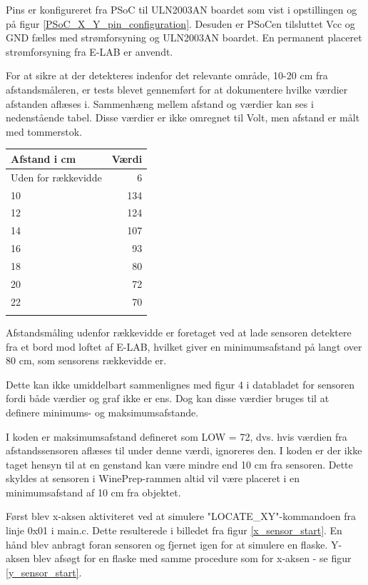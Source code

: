 Pins er konfigureret fra PSoC til ULN2003AN boardet som vist i opstillingen og på figur \ref{PSoC_X_Y_pin_configuration}. Desuden er PSoCen tilsluttet Vcc og GND fælles med strømforsyning og ULN2003AN boardet. En permanent placeret strømforsyning fra E-LAB er anvendt.

For at sikre at der detekteres indenfor det relevante område, 10-20 cm fra afstandsmåleren, er tests blevet gennemført for at dokumentere hvilke værdier afstanden aflæses i. Sammenhæng mellem afstand og værdier kan ses i nedenstående tabel. Disse værdier er ikke omregnet til Volt, men afstand er målt med tommerstok.
\begin{table}[H]
\begin{tabular}{| l | r |}
	Afstand i cm & Værdi\\\hline
	Uden for rækkevidde & 6\\\hline
	10 & 134\\\hline
	12 & 124\\\hline
	14 & 107\\\hline
	16 & 93\\\hline
	18 & 80\\\hline
	20 & 72\\\hline
	22 & 70\\\hline
	\label{Afstand-vaerdier}
\end{tabular}
\end{table}

Afstandsmåling udenfor rækkevidde er foretaget ved at lade sensoren detektere fra et bord mod loftet af E-LAB, hvilket giver en minimumsafstand på langt over 80 cm, som sensorens rækkevidde er.

Dette kan ikke umiddelbart sammenlignes med figur 4 i databladet for sensoren fordi både værdier og graf ikke er ens. Dog kan disse værdier bruges til at definere minimums- og maksimumsafstande.

I koden er maksimumsafstand defineret som LOW = 72, dvs. hvis værdien fra afstandssensoren aflæses til under denne værdi, ignoreres den. I koden er der ikke taget hensyn til at en genstand kan være mindre end 10 cm fra sensoren. Dette skyldes at sensoren i WinePrep-rammen altid vil være placeret i en minimumsafstand af 10 cm fra objektet.

Først blev x-aksen aktiviteret ved at simulere "LOCATE_XY"-kommandoen fra linje 0x01 i main.c. Dette resulterede i billedet fra figur \ref{x_sensor_start}. En hånd blev anbragt foran sensoren og fjernet igen for at simulere en flaske. Y-aksen blev afsøgt for en flaske med samme procedure som for x-aksen - se figur \ref{y_sensor_start}.

